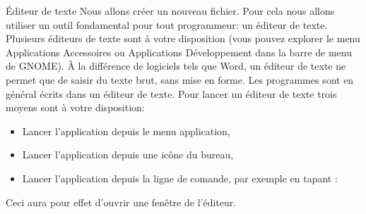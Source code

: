 \begin{exercice}
  \begin{exercicelet}{Éditeur de texte}
    Nous allons créer un nouveau fichier. Pour cela nous allons utiliser
    un outil fondamental pour tout programmeur: un éditeur de
    texte. Plusieurs éditeurs de texte sont à votre disposition (vous
    pouvez explorer le menu Applications \textrightarrow Accessoires ou
    Applications \textrightarrow Développement dans la barre de menu de
    GNOME).  À la différence de logiciels tels que Word, un éditeur de
    texte ne permet que de saisir du texte brut, sans mise en forme. Les
    programmes sont en général écrits dans un éditeur de texte.  Pour
    lancer un éditeur de texte trois moyens sont à votre disposition:
    \begin{itemize}
    \item Lancer l'application depuis le menu application,
    \item Lancer l'application depuis une icône du bureau,
    \item Lancer l'application depuis la ligne de comande, par exemple
      en tapant : 
    \end{itemize}
    Ceci aura pour effet d'ouvrir une fenêtre de l'éditeur.
  \end{exercicelet}
\end{exercice}
